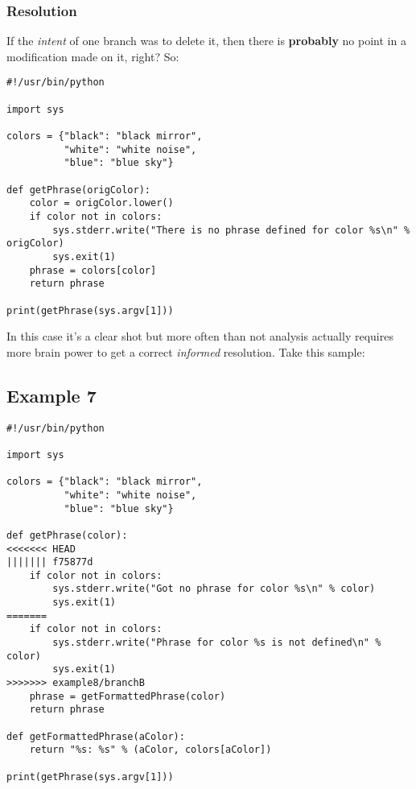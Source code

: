\subsubsection{Resolution}
If the {\it intent} of one branch was to delete it, then there is {\bf probably} no point in a modification made on it, right? So:

\begin{lstlisting}[style=python_style,
	basicstyle=\small,
	caption={\bf example 6} - resolution]
#!/usr/bin/python

import sys

colors = {"black": "black mirror",
          "white": "white noise",
          "blue": "blue sky"}

def getPhrase(origColor):
    color = origColor.lower()
    if color not in colors:
        sys.stderr.write("There is no phrase defined for color %s\n" % origColor)
        sys.exit(1)
    phrase = colors[color]
    return phrase

print(getPhrase(sys.argv[1]))
\end{lstlisting}

In this case it's a clear shot but more often than not analysis actually requires more brain power to get a correct {\it informed}
resolution. Take this sample:

\subsection{Example 7}
\label{example_07}

\begin{lstlisting}[style=python_style,
	basicstyle=\small,
	caption={\bf example 7}]
#!/usr/bin/python

import sys

colors = {"black": "black mirror",
          "white": "white noise",
          "blue": "blue sky"}

def getPhrase(color):
<<<<<<< HEAD
||||||| f75877d
    if color not in colors:
        sys.stderr.write("Got no phrase for color %s\n" % color)
        sys.exit(1)
=======
    if color not in colors:
        sys.stderr.write("Phrase for color %s is not defined\n" % color)
        sys.exit(1)
>>>>>>> example8/branchB
    phrase = getFormattedPhrase(color)
    return phrase

def getFormattedPhrase(aColor):
    return "%s: %s" % (aColor, colors[aColor])

print(getPhrase(sys.argv[1]))
\end{lstlisting}

